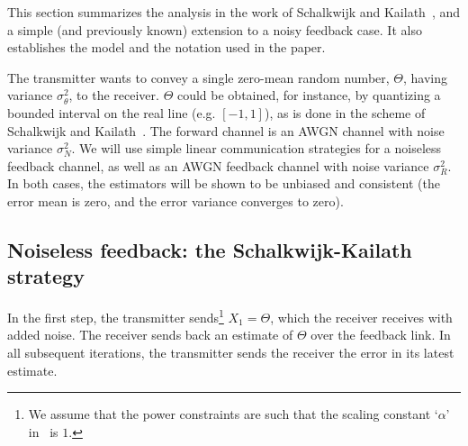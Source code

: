 \documentclass[letterpaper, 10pt, conference]{ieeeconf}
\begin{document}
This section summarizes the analysis in the work of Schalkwijk and Kailath~\cite{S&K}, and a simple (and previously known) extension to a noisy feedback case. It also establishes the model and the notation used in the paper.

The transmitter wants to convey a single zero-mean random number, $\Theta$, having variance
$\sigma_\theta^2$, to the receiver. $\Theta$ could be obtained, for instance, by quantizing a bounded interval on the real line (e.g. $[-1,1]$), as is done in the scheme of Schalkwijk and Kailath~\cite{S&K}. The forward channel is an AWGN channel with noise variance $\sigma_N^2$. We will use simple linear communication strategies for a noiseless feedback channel, as well as an AWGN feedback channel with noise variance $\sigma_R^2$. In both cases, the estimators will be shown to be unbiased and consistent (the error mean is zero, and the error variance converges to zero).


\subsection{Noiseless feedback: the Schalkwijk-Kailath strategy}
\label{sec:sk-noiseless}

 In the first step, the transmitter sends\footnote{We assume that the power constraints are such that the scaling constant `$\alpha$' in~\cite{S&K} is $1$.} $X_1 = \Theta$, which the receiver receives with added noise. The receiver sends back an estimate of $\Theta$ over the feedback link. In all subsequent iterations, the transmitter sends the receiver the error in its latest estimate.
\end{document}
